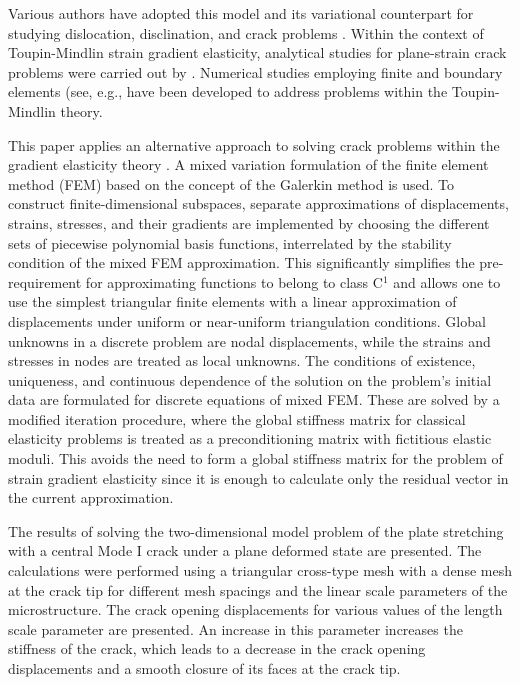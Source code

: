 Various authors have adopted this model and its variational counterpart for studying dislocation, disclination, and crack problems \cite{Chirkov5, Chirkov6, Chirkov24, Chirkov26, Chirkov27, Chirkov28, Chirkov29, Chirkov30, Chirkov31, Chirkov32}. Within the context of Toupin-Mindlin strain gradient elasticity, analytical studies for plane-strain crack problems were carried out by \cite{Chirkov14, Chirkov33}. Numerical studies employing finite and boundary elements (see, e.g., \cite{Chirkov21, Chirkov28, Chirkov31, Chirkov34, Chirkov35, Chirkov36, Chirkov37} have been developed to address problems within the Toupin-Mindlin theory.

This paper applies an alternative approach to solving crack problems within the gradient elasticity theory \cite{Chirkov38, Chirkov39, Chirkov40, Chirkov41, Chirkov42, Chirkov43}. A mixed variation formulation of the finite element method (FEM) based on the concept of the Galerkin method is used. To construct finite-dimensional subspaces, separate approximations of displacements, strains, stresses, and their gradients are implemented by choosing the different sets of piecewise polynomial basis functions, interrelated by the stability condition of the mixed FEM approximation. This significantly simplifies the pre-requirement for approximating functions to belong to class C${}^{1}$ and allows one to use the simplest triangular finite elements with a linear approximation of displacements under uniform or near-uniform triangulation conditions. Global unknowns in a discrete problem are nodal displacements, while the strains and stresses in nodes are treated as local unknowns. The conditions of existence, uniqueness, and continuous dependence of the solution on the problem's initial data are formulated for discrete equations of mixed FEM. These are solved by a modified iteration procedure, where the global stiffness matrix for classical elasticity problems is treated as a preconditioning matrix with fictitious elastic moduli. This avoids the need to form a global stiffness matrix for the problem of strain gradient elasticity since it is enough to calculate only the residual vector in the current approximation. 

The results of solving the two-dimensional model problem of the plate stretching with a central Mode I crack under a plane deformed state are presented. The calculations were performed using a triangular cross-type mesh with a dense mesh at the crack tip for different mesh spacings and the linear scale parameters of the microstructure. The crack opening displacements for various values of the length scale parameter are presented. An increase in this parameter increases the stiffness of the crack, which leads to a decrease in the crack opening displacements and a smooth closure of its faces at the crack tip. 


